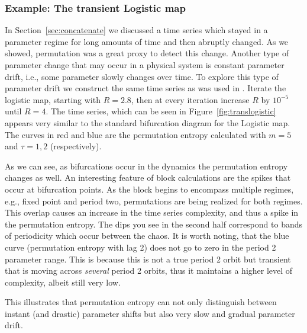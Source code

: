 \subsubsection{Example: The transient Logistic map}
In Section~\ref{sec:concatenate} we discussed a time series which stayed in a parameter regime for long amounts of time and then abruptly changed. As we showed, permutation was a great proxy to detect this change. Another type of parameter change that may occur in a physical system is constant parameter drift, i.e., some parameter slowly changes over time. To explore this type of parameter drift we construct the same time series as was used in \cite{cao2004det}. Iterate the logistic map, starting with $R=2.8$, then at every iteration increase $R$ by $10^{-5}$ until $R=4$. The time series, which can be seen in Figure~\ref{fig:translogistic} appears very similar to the standard bifurcation diagram for the Logistic map. The curves in red and blue are the permutation entropy calculated with $m=5$ and $\tau = 1,2$ (respectively).

 As we can see, as bifurcations occur in the dynamics the permutation entropy changes as well. An interesting feature of block calculations are the spikes that occur at bifurcation points. As the block begins to encompass multiple regimes, e.g., fixed point and  period two, permutations are being realized for both regimes. This overlap causes an increase in the time series complexity, and thus a spike in the permutation entropy. The dips you see in the second half correspond to bands of periodicity which occur between the chaos. It is worth noting, that the blue curve (permutation entropy with lag 2) does not go to zero in the period 2 parameter range. This is because this is not a true period 2 orbit but transient that is moving across \emph{several} period 2 orbits, thus it maintains a higher level of complexity, albeit still very low.

 This illustrates that permutation entropy can not only distinguish between instant (and drastic) parameter shifts but also very slow and gradual parameter drift.

